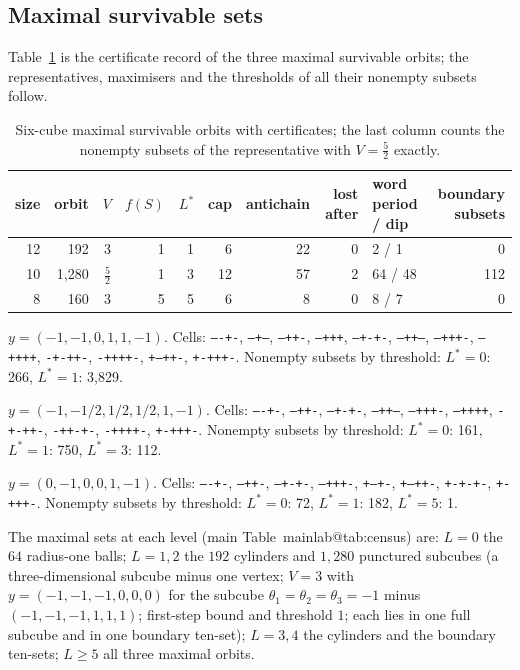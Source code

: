 \documentclass[11pt,a4paper]{article}
\makeatletter
\theoremstyle{plain}
\theoremstyle{definition}
\theoremstyle{remark}
\newcommand{\mref}[1]{\csname mainlab@#1\endcsname}
\makeatother
\begin{document}
\subsection{Maximal survivable sets}
Table~\ref{tab:S4max} is the certificate record of the three maximal survivable orbits; the representatives, maximisers and the thresholds of all their nonempty subsets follow.
\begin{table}[H]\centering\small
\caption{Six-cube maximal survivable orbits with certificates; the last column counts the nonempty subsets of the representative with $V=\tfrac52$ exactly.}\label{tab:S4max}
\begin{tabular}{rrrrrrrrlr}
\toprule
size & orbit & $V$ & $f(S)$ & $L^\ast$ & cap & antichain & lost after & word period / dip & boundary subsets\\
\midrule
12 & 192 & $3$ & 1 & 1 & 6 & 22 & 0 & 2 / 1 & 0\\
10 & 1{,}280 & $\tfrac{5}{2}$ & 1 & 3 & 12 & 57 & 2 & 64 / 48 & 112\\
8 & 160 & $3$ & 5 & 5 & 6 & 8 & 0 & 8 / 7 & 0\\
\bottomrule
\end{tabular}
\end{table}
\begin{description}[leftmargin=1.5em,style=nextline]
\item[12 cells, orbit 192.] $y=(-1,-1,0,1,1,-1)$. Cells: \texttt{----+-}, \texttt{---+--}, \texttt{---++-}, \texttt{---+++}, \texttt{--+-+-}, \texttt{--++--}, \texttt{--+++-}, \texttt{--++++}, \texttt{-+-++-}, \texttt{-++++-}, \texttt{+--++-}, \texttt{+-+++-}. Nonempty subsets by threshold: $L^\ast=0$: 266, $L^\ast=1$: 3{,}829.
\item[10 cells, orbit 1{,}280.] $y=(-1,-1/2,1/2,1/2,1,-1)$. Cells: \texttt{----+-}, \texttt{---++-}, \texttt{--+-+-}, \texttt{--++--}, \texttt{--+++-}, \texttt{--++++}, \texttt{-+-++-}, \texttt{-++-+-}, \texttt{-++++-}, \texttt{+-+++-}. Nonempty subsets by threshold: $L^\ast=0$: 161, $L^\ast=1$: 750, $L^\ast=3$: 112.
\item[8 cells, orbit 160.] $y=(0,-1,0,0,1,-1)$. Cells: \texttt{----+-}, \texttt{---++-}, \texttt{--+-+-}, \texttt{--+++-}, \texttt{+---+-}, \texttt{+--++-}, \texttt{+-+-+-}, \texttt{+-+++-}. Nonempty subsets by threshold: $L^\ast=0$: 72, $L^\ast=1$: 182, $L^\ast=5$: 1.
\end{description}
\medskip
The maximal sets at each level (main Table~\mref{tab:census}) are: $L=0$ the $64$ radius-one balls; $L=1,2$ the $192$ cylinders and $1{,}280$ punctured subcubes (a three-dimensional subcube minus one vertex; $V=3$ with $y=(-1,-1,-1,0,0,0)$ for the subcube $\theta_1=\theta_2=\theta_3=-1$ minus $(-1,-1,-1,1,1,1)$; first-step bound and threshold $1$; each lies in one full subcube and in one boundary ten-set); $L=3,4$ the cylinders and the boundary ten-sets; $L\ge5$ all three maximal orbits.
\end{document}
